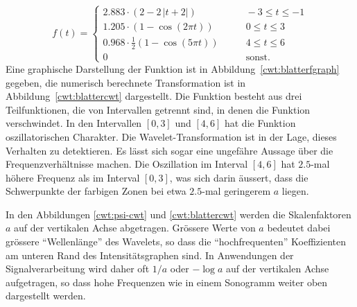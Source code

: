 \begin{beispiel}
\begin{equation}
f(t) = \begin{cases}
2.883 \cdot (2 - 2\,|t+2|)&\qquad -3\le t \le -1\\
1.205\cdot (1-\cos(2\pi t))&\qquad 0\le t \le 3\\
0.968\cdot \frac12(1-\cos(5\pi t))&\qquad 4\le t \le 6\\
0&\qquad\text{sonst.}
\end{cases}
\label{cwt:blatterf}
\end{equation}
Eine graphische Darstellung der Funktion ist in
Abbildung~\ref{cwt:blatterfgraph} gegeben,
die numerisch berechnete Transformation ist in Abbildung~\ref{cwt:blattercwt}
dargestellt.
Die Funktion besteht aus drei Teilfunktionen, die von Intervallen getrennt sind,
in denen die Funktion verschwindet.
In den Intervallen $[0,3]$ und $[4,6]$ hat die Funktion oszillatorischen
Charakter.
Die Wavelet-Transformation ist in der Lage, dieses Verhalten zu detektieren.
Es lässt sich sogar eine ungefähre Aussage über die Frequenzverhältnisse
machen.
Die Oszillation im Interval $[4,6]$ hat $2.5$-mal höhere Frequenz als im
Interval $[0,3]$, was sich darin äussert, dass die Schwerpunkte der farbigen
Zonen bei etwa $2.5$-mal geringerem $a$ liegen.
\end{beispiel}

In den Abbildungen \ref{cwt:psi-cwt} und \ref{cwt:blattercwt} werden 
die Skalenfaktoren $a$ auf der vertikalen Achse abgetragen.
Grössere Werte von $a$ bedeutet dabei grössere ``Wellenlänge'' des Wavelets,
so dass die ``hochfrequenten'' Koeffizienten am unteren Rand des
Intensitätsgraphen sind.
In Anwendungen der Signalverarbeitung wird daher oft $1/a$ oder $-\log a$ 
auf der vertikalen Achse aufgetragen, so dass hohe Frequenzen wie in
einem Sonogramm weiter oben dargestellt werden.

